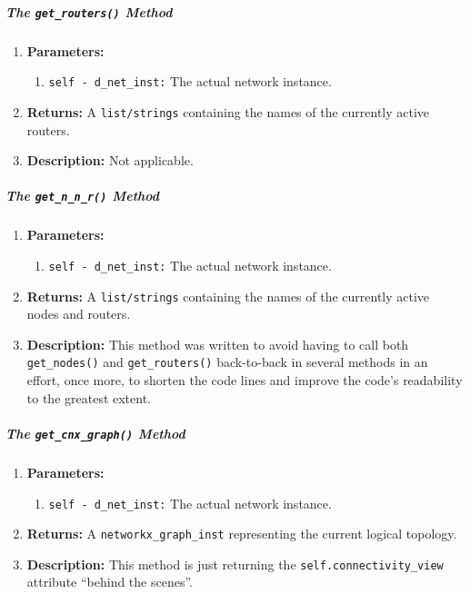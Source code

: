     \subparagraph{The \texttt{get\_routers()} Method}
        \begin{enumerate}
            \item \textbf{Parameters:}
            \begin{enumerate}
                \item \texttt{self - d\_net\_inst:} The actual network instance.
            \end{enumerate}
            \item \textbf{Returns:} A \texttt{list/strings} containing the names of the currently active routers.
            \item \textbf{Description:} Not applicable.
        \end{enumerate}

    \subparagraph{The \texttt{get\_n\_n\_r()} Method}
        \begin{enumerate}
            \item \textbf{Parameters:}
            \begin{enumerate}
                \item \texttt{self - d\_net\_inst:} The actual network instance.
            \end{enumerate}
            \item \textbf{Returns:} A \texttt{list/strings} containing the names of the currently active nodes and routers.
            \item \textbf{Description:} This method was written to avoid having to call both \texttt{get\_nodes()} and \texttt{get\_routers()} back-to-back in several methods in an effort, once more, to shorten the code lines and improve the code's readability to the greatest extent.
        \end{enumerate}

    \subparagraph{The \texttt{get\_cnx\_graph()} Method}
        \begin{enumerate}
            \item \textbf{Parameters:}
            \begin{enumerate}
                \item \texttt{self - d\_net\_inst:} The actual network instance.
            \end{enumerate}
            \item \textbf{Returns:} A \texttt{networkx\_graph\_inst} representing the current logical topology.
            \item \textbf{Description:} This method is just returning the \texttt{self.connectivity\_view} attribute ``behind the scenes''.
        \end{enumerate}

